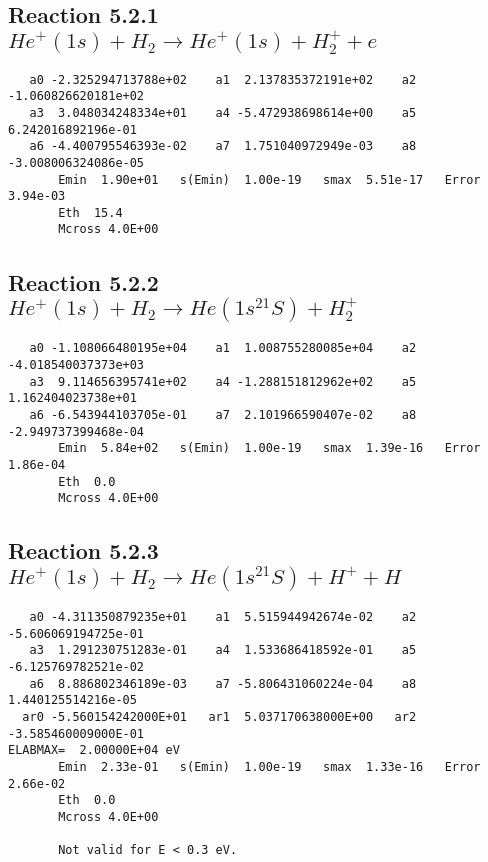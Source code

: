 \documentclass[12pt,dvipdfmx]{article}
\begin{document}
\newpage
\subsection{
Reaction 5.2.1 $   He^+(1s) + H_2 \rightarrow He^+(1s) + H_2^+ + e$}


\begin{small}\begin{verbatim}
   a0 -2.325294713788e+02    a1  2.137835372191e+02    a2 -1.060826620181e+02
   a3  3.048034248334e+01    a4 -5.472938698614e+00    a5  6.242016892196e-01
   a6 -4.400795546393e-02    a7  1.751040972949e-03    a8 -3.008006324086e-05
       Emin  1.90e+01   s(Emin)  1.00e-19   smax  5.51e-17   Error  3.94e-03
       Eth  15.4
       Mcross 4.0E+00

\end{verbatim}\end{small}

\newpage
\subsection{
Reaction 5.2.2 $   He^+(1s) + H_2 \rightarrow He(1s^21S) + H_2^+$}


\begin{small}\begin{verbatim}
   a0 -1.108066480195e+04    a1  1.008755280085e+04    a2 -4.018540037373e+03
   a3  9.114656395741e+02    a4 -1.288151812962e+02    a5  1.162404023738e+01
   a6 -6.543944103705e-01    a7  2.101966590407e-02    a8 -2.949737399468e-04
       Emin  5.84e+02   s(Emin)  1.00e-19   smax  1.39e-16   Error  1.86e-04
       Eth  0.0
       Mcross 4.0E+00
\end{verbatim}\end{small}

\newpage
\subsection{
Reaction 5.2.3 $   He^+(1s) + H_2 \rightarrow He(1s^21S) + H^+ + H$}


\begin{small}\begin{verbatim}
   a0 -4.311350879235e+01    a1  5.515944942674e-02    a2 -5.606069194725e-01
   a3  1.291230751283e-01    a4  1.533686418592e-01    a5 -6.125769782521e-02
   a6  8.886802346189e-03    a7 -5.806431060224e-04    a8  1.440125514216e-05
  ar0 -5.560154242000E+01   ar1  5.037170638000E+00   ar2 -3.585460009000E-01
ELABMAX=  2.00000E+04 eV
       Emin  2.33e-01   s(Emin)  1.00e-19   smax  1.33e-16   Error  2.66e-02
       Eth  0.0
       Mcross 4.0E+00

       Not valid for E < 0.3 eV.
\end{verbatim}\end{small}
\end{document}
